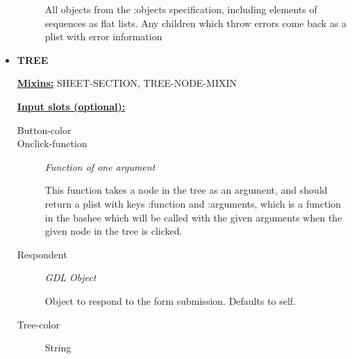 \documentclass [11pt]{book}
\begin{document}
\begin{itemize}
\begin{description}
 All objects from the :objects specification, including elements of sequences
as flat lists. Any children which throw errors come back as a plist with error information




\end{description}







\item {}
\textbf{TREE}


\textbf{
\underline{Mixins:}} SHEET-SECTION, TREE-NODE-MIXIN





\begin{description}

\end{description}








\textbf{
\underline{Input slots (optional):}}

\begin{description}

\item [Button-color]





\item [Onclick-function]
\emph{Function of one argument}

 This function takes a node in the tree as an argument, and should return
a plist with keys :function and :arguments, which is a function in the bashee which will be called
with the given arguments when the given node in the tree is clicked.




\item [Respondent]
\emph{GDL Object}

 Object to respond to the form submission. Defaults to self.




\item [Tree-color]

String




\end{description}







\end{itemize}
\end{document}
